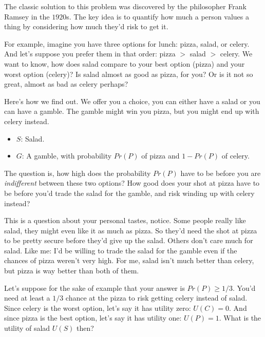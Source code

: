 \documentclass[justified]{tufte-book}
\providecommand{\tightlist}{%
  \setlength{\itemsep}{0pt}\setlength{\parskip}{0pt}}
\renewcommand{\u}{U}
\newcommand{\gt}{>}
\newcommand{\p}{Pr}
\theoremstyle{definition}
\theoremstyle{definition}
\theoremstyle{definition}
\theoremstyle{remark}
\begin{document}
The classic solution to this problem was discovered by the philosopher
Frank Ramsey in the \(1920\)s. The key idea is to quantify how much a
person values a thing by considering how much they'd risk to get it.

For example, imagine you have three options for lunch: pizza, salad, or
celery. And let's suppose you prefer them in that order: pizza \(\gt\)
salad \(\gt\) celery. We want to know, how does salad compare to your
best option (pizza) and your worst option (celery)? Is salad almost as
good as pizza, for you? Or is it not so great, almost as bad as celery
perhaps?

Here's how we find out. We offer you a choice, you can either have a
salad or you can have a gamble. The gamble might win you pizza, but you
might end up with celery instead.

\begin{itemize}
\tightlist
\item
  \(S\): Salad.
\item
  \(G\): A gamble, with probability \(\p(P)\) of pizza and \(1-\p(P)\)
  of celery.
\end{itemize}

The question is, how high does the probability \(\p(P)\) have to be
before you are \emph{indifferent} between these two options? How good
does your shot at pizza have to be before you'd trade the salad for the
gamble, and risk winding up with celery instead?

This is a question about your personal tastes, notice. Some people
really like salad, they might even like it as much as pizza. So they'd
need the shot at pizza to be pretty secure before they'd give up the
salad. Others don't care much for salad. Like me: I'd be willing to
trade the salad for the gamble even if the chances of pizza weren't very
high. For me, salad isn't much better than celery, but pizza is way
better than both of them.

Let's suppose for the sake of example that your answer is
\(\p(P) \geq 1/3\). You'd need at least a \(1/3\) chance at the pizza to
risk getting celery instead of salad. Since celery is the worst option,
let's say it has utility zero: \(\u(C)=0\). And since pizza is the best
option, let's say it has utility one: \(\u(P)=1\). What is the utility
of salad \(\u(S)\) then?
\end{document}
